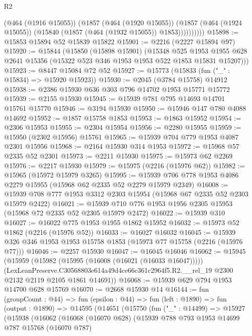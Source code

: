 \begin{lexlean}{R2}
\begin{coremodule}
                (@464 (@1916 @15055))
                (@1857
                  (@464 (@1920 @15055))
                  (@1857 (@464 (@1924 @15055)) (@15840 (@1857 (@464 (@1932 @15055)) @1853))))))))))
@15898 := @15853 @15894 @52 @15839 @15822
@15901 := @2216 (@2227 @15894 @97)
@15920 := @15844
    (@15850
      (@15898 @15901)
      (@15348
        @525
        @1953
        @1955
        @628
        @2641
        @15356
        (@15322 @523 @346 @1953 @1953 @522 @1853 @15831 @15207)))
@15923 := @8447 @15084 @72 @52
@15927 := @15773 (@15833 (fun ("_" : @15834) => @15920 @15923))
@15930 := @2045 (@3784 @15758) @14912
@15938 := @2386 @15930 @636 @303 @796 @14702 @1953 @15771 @15772
@15939 := @2155 @15930
@15945 := @15939 @781 @795 @14693 @14701 @15761 @15770
@15946 := @3194 @15930
@15950 := @15946 @147 @780 @4088 @14692
@15952 := @1857 @15758 @1853
@15953 := @1863 @15952
@15954 := @2306 @15953
@15955 := @2304 @15954
@15956 := @2280 @15955
@15959 := @15950 (@2302 @15956) @15761
@15965 := @15939 @704 @779 @1953 @4087 @2301 @15956
@15968 := @2164 @15930 @314 @1953
@15972 := @15968 @57 @2335 @52 @2301
@15973 := @2211 @15930
@15975 := @15973 @62 @2269
@15976 := @2217 @15930
@15979 := @15975 (@2216 (@15976 @62))
@15982 := @15965 (@15972 @15979 @3265)
@15995 := @15939 @706 @778 @1953 @4086 @2279 @15955 (@15968 @62 @2335 @52 @2279 @15979 @2349)
@16008 := @15939 @708 @777 @1953 @3312 @2303 @15954 (@15968 @67 @2335 @52 @2303 @15979 @2422)
@16021 := @15939 @710 @776 @1953 @1956 @2305 @15953 (@15968 @72 @2335 @52 @2305 @15979 @2472)
@16022 := @15939 @310
@16027 := @16022 @775 @1953 @1955 @1862 @15952
@16032 := @15973 @52 @1862 (@2216 (@15976 @52))
@16033 := @16027 @16032
@16045 := @15939 @326 @346 @1953 @1953 @15758 @1853 (@15973 @77 @15758 (@2216 (@15976 @77)))
@16046 := @2257 @15930
@16047 := @16045 @16046
@16062 := @15945
    (@15959
      (@15982 (@15995 (@16008 (@16021 (@16033 @16047)))))
      (LexLeanPreserve.C30568803e614a49d4ce66c361c2964f5.R2.__rel_19
        @2300
        @2132
        @2119
        @2105
        @1861
        @14691))
@16068 := @15939 @629 @794 @1953 @14700 @628 @15769
@16070 := @2668 @15930 @14
@16144 := fun (groupCount : @44) =>
  fun (epsilon : @44) =>
  fun (left : @1890) =>
  fun (output : @1890) =>
  @14595
    (@14651
      (@15750
        (fun ("_" : @14499) =>
        @15927
          (@15938
            (@16062
              (@16068
                (@16070 @628)
                (@15939
                  @788
                  @793
                  @1953
                  @14699
                  @787
                  @15768
                  (@16070 @787)

\end{coremodule}
\end{lexlean}
